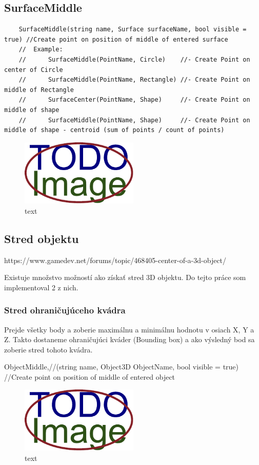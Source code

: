 \subsection{SurfaceMiddle}


\begin{lstlisting}
	SurfaceMiddle(string name, Surface surfaceName, bool visible = true) //Create point on position of middle of entered surface
	//	Example:
	//		SurfaceMiddle(PointName, Circle)	//- Create Point on center of Circle
	//		SurfaceMiddle(PointName, Rectangle)	//- Create Point on middle of Rectangle
	//		SurfaceCenter(PointName, Shape)		//- Create Point on middle of shape 
	//		SurfaceMiddle(PointName, Shape)		//- Create Point on middle of shape - centroid (sum of points / count of points)
\end{lstlisting}

\begin{figure}[H]
	\centering
	\includegraphics[width=0.5\textwidth]{obrazky-figures/placeholder.pdf}
	\caption{text}
	\label{fig:1}
\end{figure}

\subsection{Stred objektu}
https://www.gamedev.net/forums/topic/468405-center-of-a-3d-object/

Existuje množstvo možností ako získať stred 3D objektu. Do tejto práce som implementoval 2 z nich. 
\subsubsection{Stred ohraničujúceho kvádra}
Prejde všetky body a zoberie maximálnu a minimálnu hodnotu v osiach X, Y a Z. Takto dostaneme ohraničujúci kváder (Bounding box) a ako výsledný bod sa zoberie stred tohoto kvádra.

		ObjectMiddle,//(string name, Object3D ObjectName, bool visible = true) //Create point on position of middle of entered object
		
\begin{figure}[H]
	\centering
	\includegraphics[width=0.5\textwidth]{obrazky-figures/placeholder.pdf}
	\caption{text}
	\label{fig:1}
\end{figure}

